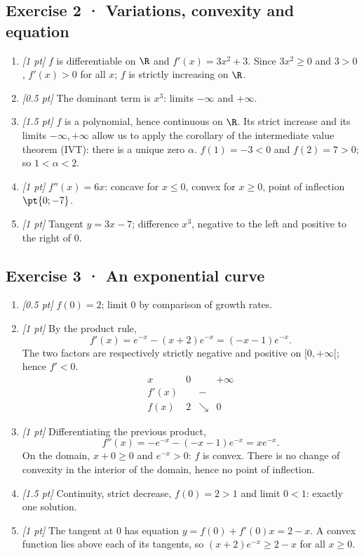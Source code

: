 \subsection*{Exercise 2 · Variations, convexity and equation}\begin{enumerate}

\item \textit{[1 pt]} $f$ is differentiable on $\R$ and $f'(x)=3x^2+3$. Since $3x^2\ge0$ and $3>0$, $f'(x)>0$ for all $x$; $f$ is strictly increasing on $\R$.

\item \textit{[0.5 pt]} The dominant term is $x^3$: limits $-\infty$ and $+\infty$.

\item \textit{[1.5 pt]} $f$ is a polynomial, hence continuous on $\R$. Its strict increase and its limits $-\infty,+\infty$ allow us to apply the corollary of the intermediate value theorem (IVT): there is a unique zero $\alpha$. $f(1)=-3<0$ and $f(2)=7>0$; so $1<\alpha<2$.

\item \textit{[1 pt]} $f''(x)=6x$: concave for $x\le0$, convex for $x\ge0$, point of inflection $\pt{0;-7}$.

\item \textit{[1 pt]} Tangent $y=3x-7$; difference $x^3$, negative to the left and positive to the right of $0$.

\end{enumerate}

\subsection*{Exercise 3 · An exponential curve}\begin{enumerate}

\item \textit{[0.5 pt]} $f(0)=2$; limit $0$ by comparison of growth rates.

\item \textit{[1 pt]} By the product rule,
\[f'(x)=e^{-x}-(x+2)e^{-x}=(-x-1)e^{-x}.\]
The two factors are respectively strictly negative and positive on $[0,+\infty[$; hence $f'<0$.
\[\begin{array}{c|ccc}x&0&&+\infty\\\hline f'(x)&&-&\\\hline f(x)&2&\searrow&0\end{array}\]

\item \textit{[1 pt]} Differentiating the previous product,
\[f''(x)=-e^{-x}-(-x-1)e^{-x}=xe^{-x}.\]
On the domain, $x+0\ge0$ and $e^{-x}>0$: $f$ is convex. There is no change of convexity in the interior of the domain, hence no point of inflection.

\item \textit{[1.5 pt]} Continuity, strict decrease, $f(0)=2>1$ and limit $0<1$: exactly one solution.

\item \textit{[1 pt]} The tangent at $0$ has equation $y=f(0)+f'(0)x=2-x$. A convex function lies above each of its tangents, so $(x+2)e^{-x}\ge 2-x$ for all $x\ge0$.

\end{enumerate}

